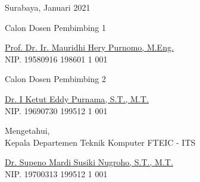 \begin{flushright}
  Surabaya, Januari 2021
\end{flushright}
\vspace{1ex}

\begin{center}

  \begin{multicols}{2}

    Calon Dosen Pembimbing 1
    \vspace{12ex}

    \underline{Prof. Dr. Ir. Mauridhi Hery Purnomo, M.Eng.} \\
    NIP. 19580916 198601 1 001

    \columnbreak

    Calon Dosen Pembimbing 2
    \vspace{12ex}

    \underline{Dr. I Ketut Eddy Purnama, S.T., M.T.} \\
    NIP. 19690730 199512 1 001

  \end{multicols}
  \vspace{6ex}

  Mengetahui, \\
  Kepala Departemen Teknik Komputer FTEIC - ITS
  \vspace{12ex}

  \underline{Dr. Supeno Mardi Susiki Nugroho, S.T., M.T.} \\
  NIP. 19700313 199512 1 001

\end{center}
